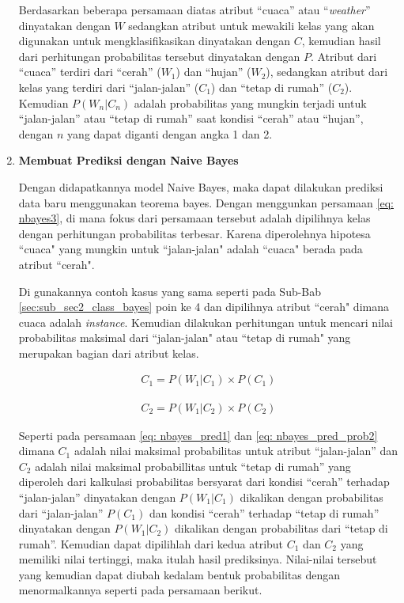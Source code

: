 \begin{enumerate}[label=\textbf{\arabic*).}]
	Berdasarkan beberapa persamaan diatas atribut ``cuaca'' atau ``\textit{weather}'' dinyatakan dengan $W$ sedangkan atribut untuk mewakili kelas yang akan digunakan untuk mengklasifikasikan dinyatakan dengan $C$, kemudian hasil dari perhitungan probabilitas tersebut dinyatakan dengan $P$. Atribut dari ``cuaca'' terdiri dari ``cerah'' ($W_{1}$) dan ``hujan'' ($W_{2}$), sedangkan atribut dari kelas yang terdiri dari ``jalan-jalan'' ($C_{1}$) dan ``tetap di rumah'' ($C_{2}$). Kemudian $P(W_{n}|C_{n})$ adalah probabilitas yang mungkin terjadi untuk ``jalan-jalan'' atau ``tetap di rumah'' saat kondisi ``cerah'' atau ``hujan'', dengan $n$ yang dapat diganti dengan angka 1 dan 2.
	\vspace{1ex}

	\item \textbf{Membuat Prediksi dengan Naive Bayes}

	Dengan didapatkannya model Naive Bayes, maka dapat dilakukan prediksi data baru menggunakan teorema bayes. Dengan menggunkan persamaan \ref{eq: nbayes3}, di mana fokus dari persamaan tersebut adalah dipilihnya kelas dengan perhitungan probabilitas terbesar. Karena diperolehnya hipotesa ``cuaca" yang mungkin untuk ``jalan-jalan" adalah ``cuaca" berada pada atribut ``cerah".
	\vspace{1ex}

	Di gunakannya contoh kasus yang sama seperti pada Sub-Bab \ref{sec:sub_sec2_class_bayes} poin ke 4 dan dipilihnya atribut ``cerah" dimana cuaca adalah \textit{instance}. Kemudian dilakukan perhitungan untuk mencari nilai probabilitas maksimal dari ``jalan-jalan" atau ``tetap di rumah" yang merupakan bagian dari atribut kelas.

	\begin{equation}\label{eq: nbayes_pred1}
	\begin{split}
	C_{1} = P(W_{1}|C_{1}) \times P(C_{1})
	\end{split}
	\end{equation}
	
	\begin{equation}\label{eq: nbayes_pred2}
	\begin{split}
	C_{2} = P(W_{1}|C_{2}) \times P(C_{2})
	\end{split}
	\end{equation}

	Seperti pada persamaan \ref{eq: nbayes_pred1} dan \ref{eq: nbayes_pred_prob2} dimana $C_{1}$ adalah nilai maksimal probabilitas untuk atribut ``jalan-jalan'' dan $C_{2}$ adalah nilai maksimal probabillitas untuk ``tetap di rumah'' yang diperoleh dari kalkulasi probabilitas bersyarat dari kondisi ``cerah'' terhadap ``jalan-jalan'' dinyatakan dengan $P(W_{1}|C_{1})$ dikalikan dengan probabilitas dari ``jalan-jalan'' $P(C_{1})$ dan kondisi ``cerah'' terhadap ``tetap di rumah'' dinyatakan dengan $P(W_{1}|C_{2})$ dikalikan dengan probabilitas dari ``tetap di rumah''. Kemudian dapat dipilihlah dari kedua atribut $C_{1}$ dan $C_{2}$ yang memiliki nilai tertinggi, maka itulah hasil prediksinya. Nilai-nilai tersebut yang kemudian dapat diubah kedalam bentuk probabilitas dengan menormalkannya seperti pada persamaan berikut.


\end{enumerate}
